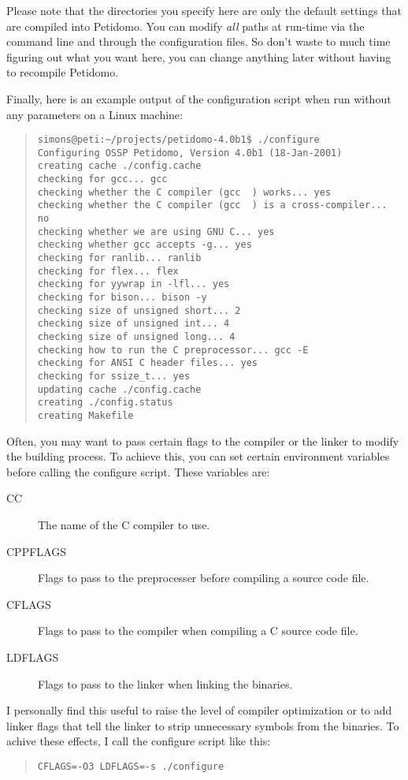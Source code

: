\documentclass[a4paper,11pt]{scrreprt}
\begin{document}
Please note that the directories you specify here are only the default
settings that are compiled into Petidomo. You can modify \emph{all}
paths at run-time via the command line and through the configuration
files. So don't waste to much time figuring out what you want here,
you can change anything later without having to recompile Petidomo.

Finally, here is an example output of the configuration script when
run without any parameters on a Linux machine:
\begin{quote}
\begin{verbatim}
simons@peti:~/projects/petidomo-4.0b1$ ./configure
Configuring OSSP Petidomo, Version 4.0b1 (18-Jan-2001)
creating cache ./config.cache
checking for gcc... gcc
checking whether the C compiler (gcc  ) works... yes
checking whether the C compiler (gcc  ) is a cross-compiler... no
checking whether we are using GNU C... yes
checking whether gcc accepts -g... yes
checking for ranlib... ranlib
checking for flex... flex
checking for yywrap in -lfl... yes
checking for bison... bison -y
checking size of unsigned short... 2
checking size of unsigned int... 4
checking size of unsigned long... 4
checking how to run the C preprocessor... gcc -E
checking for ANSI C header files... yes
checking for ssize_t... yes
updating cache ./config.cache
creating ./config.status
creating Makefile
\end{verbatim}
\end{quote}

Often, you may want to pass certain flags to the compiler or the
linker to modify the building process. To achieve this, you can set
certain environment variables before calling the configure script.
These variables are:
\begin{description}
\item[CC] The name of the C compiler to use.

\item[CPPFLAGS] Flags to pass to the preprocesser before compiling a
source code file.

\item[CFLAGS] Flags to pass to the compiler when compiling a C source
code file.

\item[LDFLAGS] Flags to pass to the linker when linking the binaries.

\end{description}

I personally find this useful to raise the level of compiler
optimization or to add linker flags that tell the linker to strip
unnecessary symbols from the binaries. To achive these effects, I call
the configure script like this:
\begin{quote}
\begin{verbatim}
CFLAGS=-O3 LDFLAGS=-s ./configure
\end{verbatim}
\end{quote}
\end{document}
